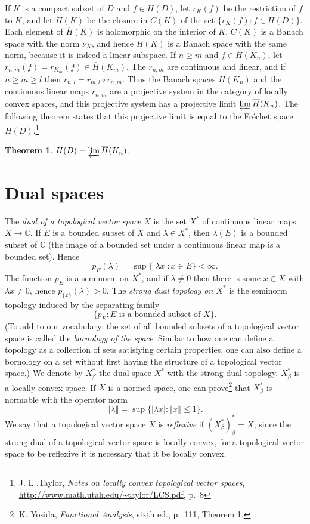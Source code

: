 \documentclass{article}
\newcommand{\norm}[1]{\left\Vert #1 \right\Vert}
\newtheorem{theorem}{Theorem}
\begin{document}
If $K$ is a compact subset of $D$ and $f \in H(D)$, let $r_K(f)$ be the restriction of $f$ to $K$, and let $\overline{H}(K)$ be the closure
in  $C(K)$ of the set $\{r_K(f):f \in H(D)\}$. Each element of $\overline{H}(K)$ is holomorphic on the interior of $K$.
$C(K)$ is a Banach space with the norm  $\nu_K$, and hence $\overline{H}(K)$ is a Banach space with the same norm, because it is indeed a linear subspace.
If $n \geq m$ and $f \in \overline{H}(K_n)$, let $r_{n,m}(f)=r_{K_m}(f) \in \overline{H}(K_m)$.
The $r_{n,m}$ are continuous and linear, and if $n \geq m \geq l$ then $r_{n,l} = r_{m,l} \circ r_{n,m}$. Thus the Banach spaces $\overline{H}(K_n)$ and the continuous linear
maps
$r_{n,m}$ are a projective system in the category of locally convex spaces, and this projective system has a projective limit $\varprojlim \overline{H}(K_n)$.
The following theorem states that this projective limit is equal to the Fr\'echet space $H(D)$.\footnote{J. L .Taylor, {\em Notes on locally convex topological vector spaces},
\url{http://www.math.utah.edu/~taylor/LCS.pdf}, p.~8} 


\begin{theorem}
$H(D)=\varprojlim \overline{H}(K_n)$.
\end{theorem}


\section{Dual spaces}
The {\em dual  of a topological vector space $X$} is the set $X^*$ of continuous linear maps $X \to \mathbb{C}$. 
If $E$ is a bounded subset of $X$ and $\lambda \in X^*$, then $\lambda(E)$ is a bounded subset of $\mathbb{C}$ (the image of a bounded set under a continuous linear map is a bounded set).
Hence
\[
p_E(\lambda) = \sup \{ |\lambda x| : x \in E\} < \infty.
\]
The function $p_E$ is a seminorm on $X^*$, and if $\lambda \neq 0$ then there is some $x \in X$ with $\lambda x \neq 0$,
 hence $p_{\{x\}}(\lambda) >0$. 
The {\em strong dual  topology on $X^*$} is the seminorm topology induced by the separating family
\[
\{p_E: \textrm{$E$ is a bounded subset of $X$}\}.
\]
(To add to our vocabulary: the set of all bounded subsets of a topological vector space is called the {\em bornology of the space}. Similar
to how one can define a topology as a collection of sets satisfying certain properties, one can also define a bornology on a set
 without first having the structure of a topological vector space.)
We denote by $X_\beta^*$ the dual space $X^*$ with the strong dual topology. $X_\beta^*$ is a locally convex space.
If $X$ is a normed space, one can prove\footnote{K. Yosida,
{\em Functional Analysis}, sixth ed., p.~111,  Theorem 1.} that $X_\beta^*$ is normable with the operator norm
\[
\norm{\lambda} = \sup \{ |\lambda x| : \norm{x} \leq 1\}.
\]
We say that a topological vector space $X$ is {\em reflexive} if $(X_\beta^*)_\beta^*=X$; since the strong dual
of a topological vector space is locally convex, for a topological vector space to be reflexive it is necessary
that it be locally convex.
\end{document}
